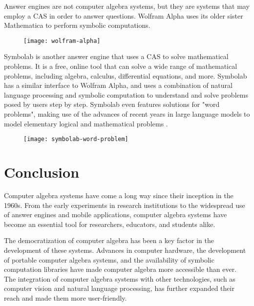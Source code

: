 Answer engines are not computer algebra systems, but they are systems that may employ a CAS in order to answer questions. Wolfram Alpha uses its older sister Mathematica to perform symbolic computations.

\begin{figure}[htb]
      {\texttt{[image: wolfram-alpha]}}
\end{figure}

Symbolab is another answer engine that uses a CAS to solve mathematical problems. It is a free, online tool that can solve a wide range of mathematical problems, including algebra, calculus, differential equations, and more. Symbolab has a similar interface to Wolfram Alpha, and uses a combination of natural language processing and symbolic computation to understand and solve problems posed by users step by step. Symbolab even features solutions for "word problems", making use of the advances of recent years in large language models to model elementary logical and mathematical problems \parencite{symbolab}.

\begin{figure}[htb]
      {\texttt{[image: symbolab-word-problem]}}
\end{figure}

\section{Conclusion}\label{sec:conclusion}

Computer algebra systems have come a long way since their inception in the 1960s. From the early experiments in research institutions to the widespread use of answer engines and mobile applications, computer algebra systems have become an essential tool for researchers, educators, and students alike.

The democratization of computer algebra has been a key factor in the development of these systems. Advances in computer hardware, the development of portable computer algebra systems, and the availability of symbolic computation libraries have made computer algebra more accessible than ever. The integration of computer algebra systems with other technologies, such as computer vision and natural language processing, has further expanded their reach and made them more user-friendly.

